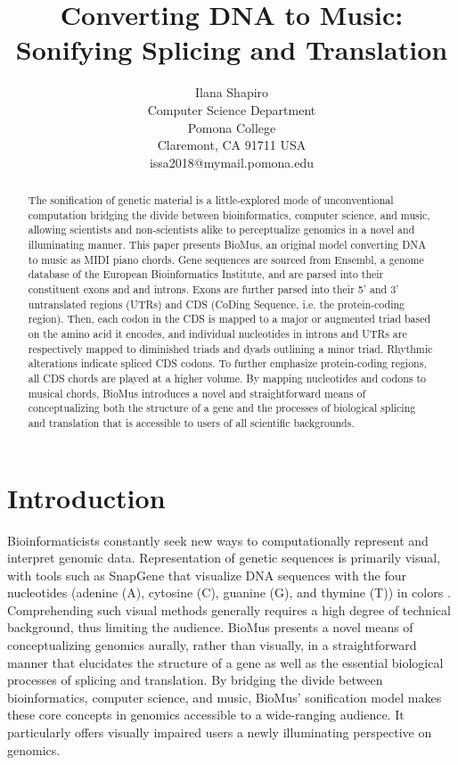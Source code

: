\documentclass[letterpaper]{article}
\title{Converting DNA to Music: Sonifying Splicing and Translation}
\author{Ilana Shapiro\\
Computer Science Department\\
Pomona College\\
Claremont, CA 91711 USA\\
issa2018@mymail.pomona.edu\\
}
\begin{document}
 
\maketitle
\begin{abstract}
The sonification of genetic material is a little-explored mode of unconventional computation bridging the divide between bioinformatics, computer science, and music, allowing scientists and non-scientists alike to perceptualize genomics in a novel and illuminating manner. This paper presents BioMus, an original model converting DNA to music as MIDI piano chords. Gene sequences are sourced from Ensembl, a genome database of the European Bioinformatics Institute, and are parsed into their constituent exons and and introns. Exons are further parsed into their 5’ and 3’ untranslated regions (UTRs) and CDS (CoDing Sequence, i.e. the protein-coding region). Then, each codon in the CDS is mapped to a major or augmented triad based on the amino acid it encodes, and individual nucleotides in introns and UTRs are respectively mapped to diminished triads and dyads outlining a minor triad. Rhythmic alterations indicate spliced CDS codons. To further emphasize protein-coding regions, all CDS chords are played at a higher volume. By mapping nucleotides and codons to musical chords, BioMus introduces a novel and straightforward means of conceptualizing both the structure of a gene and the processes of biological splicing and translation that is accessible to users of all scientific backgrounds.

\end{abstract}

\section{Introduction}
Bioinformaticists constantly seek new ways to computationally represent and interpret genomic data. Representation of genetic sequences is primarily visual, with tools such as SnapGene that visualize DNA sequences with the four nucleotides (adenine (A), cytosine (C), guanine (G), and thymine (T)) in colors \cite{goldstein_2023}.
Comprehending such visual methods generally requires a high degree of technical background, thus limiting the audience. BioMus presents a novel means of conceptualizing genomics aurally, rather than visually, in a straightforward manner that elucidates the structure of a gene as well as the essential biological processes of splicing and translation. By bridging the divide between bioinformatics, computer science, and music, BioMus’ sonification model makes these core concepts in genomics accessible to a wide-ranging audience. It particularly offers visually impaired users a newly illuminating perspective on genomics.
\end{document}
